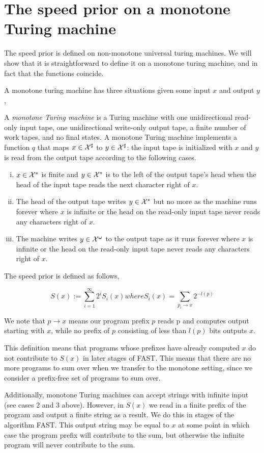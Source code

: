 \section{The speed prior on a monotone Turing machine}

The speed prior is defined on non-monotone universal turing machines. We will show that it is straightforward to define it on a monotone turing machine, and in fact that the functions coincide. 

A monotone turing machine has three situations given some input $x$ and output $y$,


\begin{definition}
\label{def:monotone-TM}
A \emph{monotone Turing machine}
is a Turing machine with
one unidirectional read-only input tape,
one unidirectional write-only output tape,
a finite number of work tapes, and no final states.
A monotone Turing machine implements a function $q$
that maps $x \in \mathcal{X}^\sharp$ to $y \in \mathcal{X}^\sharp$:
the input tape is initialized with $x$
and $y$ is read from the output tape according to the following cases.
\begin{enumerate}[(i)]
\item $x \in \mathcal{X}^*$ is finite and
	$y \in \mathcal{X}^*$ is to the left of the output tape's head when
	the head of the input tape reads the next character right of $x$.
\item The head of the output tape writes $y \in \mathcal{X}^*$ but no more
	as the machine runs forever where
	$x$ is infinite or
	the head on the read-only input tape never reads any characters right of $x$.
\item The machine writes $y \in \mathcal{X}^\omega$ to the output tape
	as it runs forever where
	$x$ is infinite or
	the head on the read-only input tape never reads any characters right of $x$.
\end{enumerate}
\end{definition}

The speed prior is defined as follows, 

$$ S(x) := \sum_{i=1}^\infty 2^i S_i(x) where S_i(x) = \sum_{p_i \rightarrow x} 2^{-l(p)}$$

We note that $p\rightarrow x$ means our program prefix $p$ reads p and computes output starting with $x$, while no prefix of $p$ consisting of less than $l(p)$ bits outputs $x$.

This definition means that programs whose prefixes have already computed $x$ do not contribute to $S(x)$ in later stages of FAST. This means that there are no more programs to sum over when we transfer to the monotone setting, since we consider a prefix-free set of programs to sum over.

Additionally, monotone Turing machines can accept strings with infinite input (see cases 2 and 3 above). However, in $S(x)$ we read in a finite prefix of the program and output a finite string as a result. We do this in stages of the algorithm FAST. This output string may be equal to $x$ at some point in which case the program prefix will contribute to the sum, but otherwise the infinite program will never contribute to the sum.
